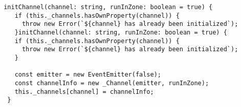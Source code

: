 \begin{verbatim}
 initChannel(channel: string, runInZone: boolean = true) {
    if (this._channels.hasOwnProperty(channel)) {
      throw new Error(`${channel} has already been initialized`);
    }initChannel(channel: string, runInZone: boolean = true) {
    if (this._channels.hasOwnProperty(channel)) {
      throw new Error(`${channel} has already been initialized`);
    }

    const emitter = new EventEmitter(false);
    const channelInfo = new _Channel(emitter, runInZone);
    this._channels[channel] = channelInfo;
  }
\end{verbatim}
